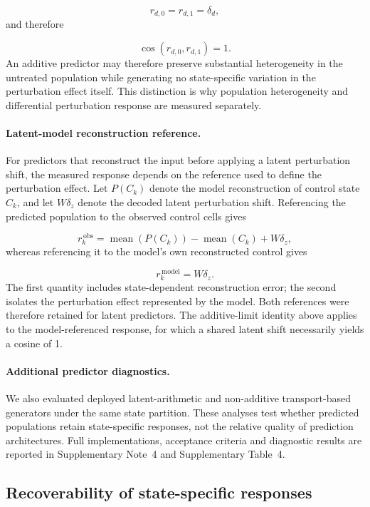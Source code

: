 \documentclass[11pt,letterpaper]{article}
\begin{document}
\[
r_{d,0}
=
r_{d,1}
=
\delta_d,
\]
and therefore

\[
\cos
\left(
r_{d,0},
r_{d,1}
\right)
=
1.
\]
An additive predictor may therefore preserve substantial heterogeneity in the untreated population
while generating no state-specific variation in the perturbation effect itself. This distinction
is why population heterogeneity and differential perturbation response are measured separately.

\paragraph{Latent-model reconstruction reference.}
For predictors that reconstruct the input before applying a latent perturbation shift, the measured
response depends on the reference used to define the perturbation effect. Let $P(C_k)$ denote the
model reconstruction of control state $C_k$, and let $W\delta_z$ denote the decoded latent
perturbation shift. Referencing the predicted population to the observed control cells gives

\[
r^{\,\mathrm{obs}}_k
=
\operatorname{mean}
\left(
P(C_k)
\right)
-
\operatorname{mean}
\left(
C_k
\right)
+
W\delta_z,
\]
whereas referencing it to the model's own reconstructed control gives

\[
r^{\,\mathrm{model}}_k
=
W\delta_z.
\]
The first quantity includes state-dependent reconstruction error; the second isolates the
perturbation effect represented by the model. Both references were therefore retained for latent
predictors. The additive-limit identity above applies to the model-referenced response, for which a
shared latent shift necessarily yields a cosine of 1.

\paragraph{Additional predictor diagnostics.}
We also evaluated deployed latent-arithmetic and non-additive transport-based generators under the
same state partition. These analyses test whether predicted populations retain state-specific
responses, not the relative quality of prediction architectures. Full implementations, acceptance
criteria and diagnostic results are reported in Supplementary Note~4 and Supplementary Table~4.


\subsection*{Recoverability of state-specific responses}
\end{document}
